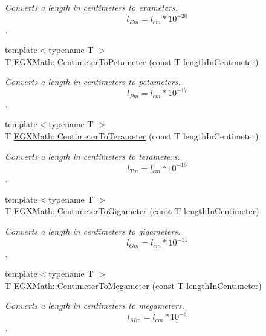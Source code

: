 \begin{DoxyCompactItemize}
\begin{DoxyCompactList}\small\item\em Converts a length in centimeters to exameters. \[ l_{Em}=l_{cm} * 10^{-20} \]. \end{DoxyCompactList}\item 
{\footnotesize template$<$typename T $>$ }\\T \mbox{\hyperlink{group___e_g_x_math-_conversions-_length_conversions-_s_i-_centimeter-_s_i_ga8fa14e761d09dc55608c28c2101f2d26}{E\+G\+X\+Math\+::\+Centimeter\+To\+Petameter}} (const T length\+In\+Centimeter)
\begin{DoxyCompactList}\small\item\em Converts a length in centimeters to petameters. \[ l_{Pm}=l_{cm} * 10^{-17} \]. \end{DoxyCompactList}\item 
{\footnotesize template$<$typename T $>$ }\\T \mbox{\hyperlink{group___e_g_x_math-_conversions-_length_conversions-_s_i-_centimeter-_s_i_ga84d4f8159550a726d78bb55e6247e10c}{E\+G\+X\+Math\+::\+Centimeter\+To\+Terameter}} (const T length\+In\+Centimeter)
\begin{DoxyCompactList}\small\item\em Converts a length in centimeters to terameters. \[ l_{Tm}=l_{cm} * 10^{-15} \]. \end{DoxyCompactList}\item 
{\footnotesize template$<$typename T $>$ }\\T \mbox{\hyperlink{group___e_g_x_math-_conversions-_length_conversions-_s_i-_centimeter-_s_i_gaf3656a809d74231d75f33a9485e4f454}{E\+G\+X\+Math\+::\+Centimeter\+To\+Gigameter}} (const T length\+In\+Centimeter)
\begin{DoxyCompactList}\small\item\em Converts a length in centimeters to gigameters. \[ l_{Gm}=l_{cm} * 10^{-11} \]. \end{DoxyCompactList}\item 
{\footnotesize template$<$typename T $>$ }\\T \mbox{\hyperlink{group___e_g_x_math-_conversions-_length_conversions-_s_i-_centimeter-_s_i_ga5ba81fb6190e6ce0032410d703d5073b}{E\+G\+X\+Math\+::\+Centimeter\+To\+Megameter}} (const T length\+In\+Centimeter)
\begin{DoxyCompactList}\small\item\em Converts a length in centimeters to megameters. \[ l_{Mm}=l_{cm} * 10^{-8} \]. \end{DoxyCompactList}\item 

\end{DoxyCompactItemize}
